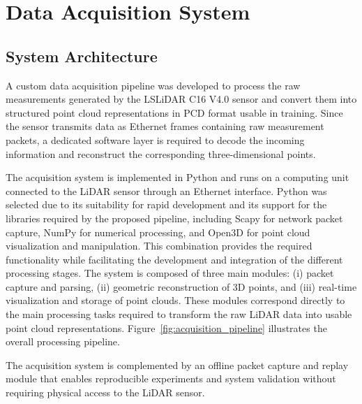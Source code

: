 \section{Data Acquisition System}
\label{sec:data_acquisition}

\subsection{System Architecture}
\label{subsec:system_architecture}

A custom data acquisition pipeline was developed to process the raw measurements generated by the LSLiDAR C16 V4.0 sensor and convert them into structured point cloud representations in PCD format usable in training. Since the sensor transmits data as Ethernet frames containing raw measurement packets, a dedicated software layer is required to decode the incoming information and reconstruct the corresponding three-dimensional points.

The acquisition system is implemented in Python and runs on a computing unit connected to the LiDAR sensor through an Ethernet interface. Python was selected due to its suitability for rapid development and its support for the libraries required by the proposed pipeline, including Scapy for network packet capture, NumPy for numerical processing, and Open3D for point cloud visualization and manipulation. This combination provides the required functionality while facilitating the development and integration of the different processing stages. The system is composed of three main modules: (i) packet capture and parsing, (ii) geometric reconstruction of 3D points, and (iii) real-time visualization and storage of point clouds. These modules correspond directly to the main processing tasks required to transform the raw LiDAR data into usable point cloud representations. Figure~\ref{fig:acquisition_pipeline} illustrates the overall processing pipeline.

The acquisition system is complemented by an offline packet capture and replay module that enables reproducible experiments and system validation without requiring physical access to the LiDAR sensor.


